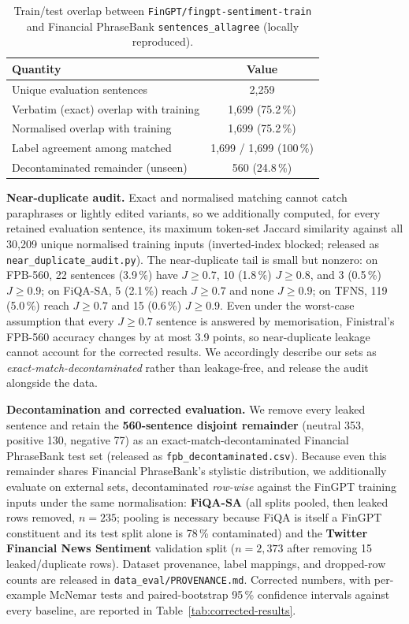 \documentclass[a4paper]{article}
\begin{document}
\begin{table}[htbp]
\centering
\caption{Train/test overlap between \texttt{FinGPT/fingpt-sentiment-train} and Financial PhraseBank \texttt{sentences\_allagree} (locally reproduced).}
\label{tab:contamination}
\begin{tabular}{lc}
\toprule
\textbf{Quantity} & \textbf{Value} \\
\midrule
Unique evaluation sentences            & 2{,}259 \\
Verbatim (exact) overlap with training & 1{,}699 (75.2\,\%) \\
Normalised overlap with training       & 1{,}699 (75.2\,\%) \\
Label agreement among matched          & 1{,}699 / 1{,}699 (100\,\%) \\
Decontaminated remainder (unseen)      & 560 (24.8\,\%) \\
\bottomrule
\end{tabular}
\end{table}

\textbf{Near-duplicate audit.} Exact and normalised matching cannot catch paraphrases or lightly edited variants, so we additionally computed, for every retained evaluation sentence, its maximum token-set Jaccard similarity against all 30{,}209 unique normalised training inputs (inverted-index blocked; released as \texttt{near\_duplicate\_audit.py}). The near-duplicate tail is small but nonzero: on FPB-560, 22 sentences (3.9\,\%) have $J \ge 0.7$, 10 (1.8\,\%) $J \ge 0.8$, and 3 (0.5\,\%) $J \ge 0.9$; on FiQA-SA, 5 (2.1\,\%) reach $J \ge 0.7$ and none $J \ge 0.9$; on TFNS, 119 (5.0\,\%) reach $J \ge 0.7$ and 15 (0.6\,\%) $J \ge 0.9$. Even under the worst-case assumption that every $J \ge 0.7$ sentence is answered by memorisation, Finistral's FPB-560 accuracy changes by at most 3.9 points, so near-duplicate leakage cannot account for the corrected results. We accordingly describe our sets as \emph{exact-match-decontaminated} rather than leakage-free, and release the audit alongside the data.

\textbf{Decontamination and corrected evaluation.} We remove every leaked sentence and retain the \textbf{560-sentence disjoint remainder} (neutral 353, positive 130, negative 77) as an exact-match-decontaminated Financial PhraseBank test set (released as \texttt{fpb\_decontaminated.csv}). Because even this remainder shares Financial PhraseBank's stylistic distribution, we additionally evaluate on external sets, decontaminated \emph{row-wise} against the FinGPT training inputs under the same normalisation: \textbf{FiQA-SA} (all splits pooled, then leaked rows removed, $n{=}235$; pooling is necessary because FiQA is itself a FinGPT constituent and its test split alone is 78\,\% contaminated) and the \textbf{Twitter Financial News Sentiment} validation split ($n{=}2{,}373$ after removing 15 leaked/duplicate rows). Dataset provenance, label mappings, and dropped-row counts are released in \texttt{data\_eval/PROVENANCE.md}. Corrected numbers, with per-example McNemar tests and paired-bootstrap 95\,\% confidence intervals against every baseline, are reported in Table~\ref{tab:corrected-results}.
\end{document}
